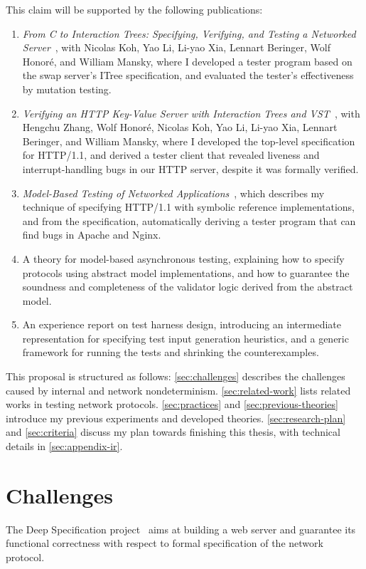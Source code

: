 \documentclass{article}
\newcommand{\http}{HTTP/1.1\xspace}
\theoremstyle{definition}
\begin{document}
\bigskip This claim will be supported by the following publications:
\begin{enumerate}
\item {\it From C to Interaction Trees: Specifying, Verifying, and Testing a
  Networked Server}~\cite{cpp19}, with Nicolas Koh, Yao Li, Li-yao Xia, Lennart
  Beringer, Wolf Honor\'e, and William Mansky, where I developed a tester
  program based on the swap server's ITree specification, and evaluated the
  tester's effectiveness by mutation testing.
\item {\it Verifying an HTTP Key-Value Server with Interaction Trees and
  VST}~\cite{itp21}, with Hengchu Zhang, Wolf Honor\'e, Nicolas Koh, Yao Li,
  Li-yao Xia, Lennart Beringer, and William Mansky, where I developed the
  top-level specification for \http, and derived a tester client that revealed
  liveness and interrupt-handling bugs in our HTTP server, despite it was
  formally verified.
\item {\it Model-Based Testing of Networked Applications}~\cite{issta21}, which
  describes my technique of specifying \http with symbolic reference
  implementations, and from the specification, automatically deriving a tester
  program that can find bugs in Apache and Nginx.
\item A theory for model-based asynchronous testing, explaining how to specify
  protocols using abstract model implementations, and how to guarantee the
  soundness and completeness of the validator logic derived from the abstract
  model.
\item An experience report on test harness design, introducing an intermediate
  representation for specifying test input generation heuristics, and a generic
  framework for running the tests and shrinking the counterexamples.
\end{enumerate}

This proposal is structured as follows: \autoref{sec:challenges} describes the
challenges caused by internal and network nondeterminism.
\autoref{sec:related-work} lists related works in testing network protocols.
\autoref{sec:practices} and \ref{sec:previous-theories} introduce my previous
experiments and developed theories.  \autoref{sec:research-plan} and
\ref{sec:criteria} discuss my plan towards finishing this thesis, with technical
details in \autoref{sec:appendix-ir}.

\section{Challenges}
\label{sec:challenges}
The Deep Specification project~\cite{deepspec} aims at building a web server and
guarantee its functional correctness with respect to formal specification of the
network protocol.
\end{document}
